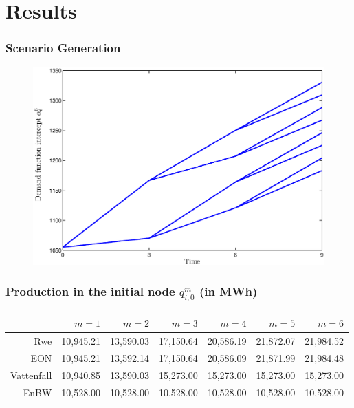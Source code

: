 \section{Results}


\begin{frame}
  \frametitle{Scenario Generation}
\begin{figure}[h]
  \centering
\includegraphics[width=1\textwidth]{intercept}
  \label{fig:intercept}
\end{figure}  
\end{frame}



\begin{frame}
  \frametitle{Production in the initial node $q_{i,0}^{m}$ (in MWh)}
  \begin{center}
\small
      \begin{tabular}{rrrrrrr}
\hline
           &     $m=1$ &     $m=2$ &     $m=3$ &     $m=4$ &     $m=5$ &     $m=6$ \\
\hline\hline
       Rwe &    10,945.21  &    13,590.03  &    17,150.64  &    20,586.19  &    21,872.07  &    21,984.52  \\

       EON &    10,945.21  &    13,592.14  &    17,150.64  &    20,586.09  &    21,871.99  &    21,984.48  \\

    Vattenfall &    10,940.85  &    13,590.03  &    15,273.00  &    15,273.00  &    15,273.00  &    15,273.00  \\

      EnBW &    10,528.00  &    10,528.00  &    10,528.00  &    10,528.00  &    10,528.00  &    10,528.00  \\
\hline
\end{tabular}
\normalsize
  \end{center}
\end{frame}



